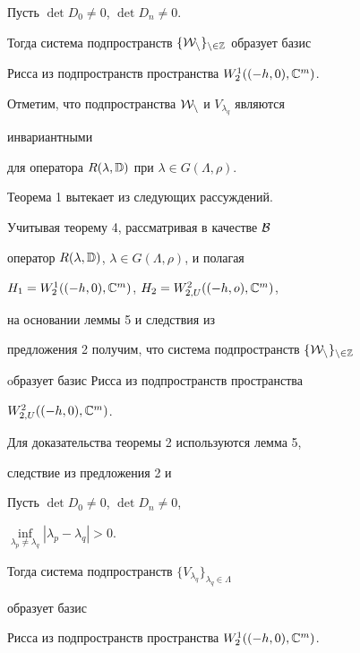  


\begin{thm} 


Пусть $\det D_0\ne0$, $\det D_n\ne0$. 


Тогда система подпространств $\{\cal W_n\}_{n\in\Bbb Z}$ образует базис 


Рисса из подпространств пространства $W^{1}_{2}((-h,0),\Bbb C^m)$. 


\end{thm} 


 


Отметим, что подпространства $\cal W_n$ и $V_{\lambda_q}$ являются 


инвариантными 


для оператора $R(\lambda,\Bbb D)$ при $\lambda\in G(\Lambda,\rho)$. 


 


Теорема 1 вытекает из следующих рассуждений. 


Учитывая теорему 4, рассматривая в качестве $\cal B$ 


оператор $R(\lambda,\Bbb D)$, $\lambda\in G(\Lambda,\rho)$, и полагая 


$H_1=W^{1}_{2}((-h,0),\Bbb C^m)$, $H_2=W^{2}_{2,U}((-h,o),\Bbb C^m)$, 


на основании леммы 5 и следствия из 


предложения 2 получим, что система подпространств $\{\cal 


W_n\}_{n\in\Bbb Z}$ 


oбразует базис Рисса из подпространств пространства 


$W^{2}_{2,U}((-h,0),\Bbb C^m)$. 


 


Для доказательства теоремы 2 используются лемма 5, 


следствие из предложения 2 и 


 


\begin{thm} 


Пусть $\det D_0\ne0$, $\det D_n\ne0$, 


$\inf\limits_{\lambda_p\ne\lambda_q}|\lambda_p-\lambda_q|>0$. 


Тогда система подпространств $\{V_{\lambda_q}\}_{\lambda_q\in\Lambda}$ 


образует базис 


Рисса из подпространств пространства $W^{1}_{2}((-h,0),\Bbb C^m)$. 


\end{thm} 


